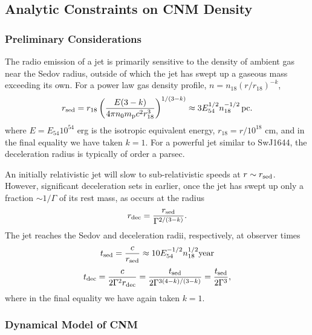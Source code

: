 \documentclass[usenatbib,fleqn]{mnras}
\begin{document}
\subsection{Analytic Constraints on CNM Density}
\label{sec:analy}

\subsubsection{Preliminary Considerations}

The radio emission of a jet is primarily sensitive to the density of
ambient gas near the Sedov radius, outside of which the jet has
swept up a gaseous mass exceeding its own. For a power law gas density
profile, $n= n_{18} \left(r/r_{18}\right)^{-k}$,
\begin{equation}
  r_{\rm sed} = r_{18} \left( \frac{E(3-k)}{4\pi n_{0}
      m_{\rm p} c^2 r_{18}^3} \right)^{1/(3-k)} \approx 3 E_{54}^{1/2} n_{\rm 18}^{-1/2}\,{\rm pc}. 
  \label{eq:rdec}
\end{equation}
where $E = E_{54}10^{54}$ erg is the isotropic equivalent energy,
$r_{18} = r/10^{18}$ cm, and in the final equality we have taken $k =
1$.  For a powerful jet similar to SwJ1644, the deceleration radius is
typically of order a parsec.

An initially relativistic jet will slow to sub-relativistic speeds at
$r \sim r_{\rm sed}$.  However, significant deceleration sets in earlier, once the
jet has swept up only a fraction $\sim 1/\Gamma$ of its rest mass, as
occurs at the radius
\begin{equation}
  r_{\rm dec}=\frac{r_{\rm sed}}{\Gamma^{2/(3-k)}}.
  \label{eq:rdec2}
\end{equation}
%
The jet reaches
 the Sedov and deceleration radii, respectively, at
observer times 
\begin{equation}
t_{\rm sed} = \frac{c}{r_{\rm sed}} \approx
10 E_{54}^{-1/2}n_{18}^{1/2} {\rm year}
 \end{equation} 
\begin{equation}
t_{\rm dec} =
\frac{c}{2\Gamma^{2} r_{\rm dec}} = \frac{t_{\rm
    sed}}{2\Gamma^{3(4-k)/(3-k)}} = \frac{t_{\rm sed}}{2\Gamma^{3}},
 \label{eq:tdec}
\end{equation}
%
where in the final equality we have again taken $k = 1$.


\subsubsection{Dynamical Model of CNM}
\label{sec:model}
\end{document}
